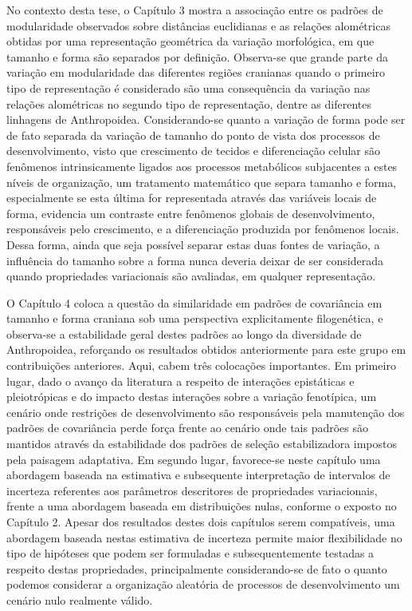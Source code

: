 \documentclass[12pt,twoside]{report}
\begin{document}
No contexto desta tese, o Capítulo 3 mostra a associação entre os
padrões de modularidade observados sobre distâncias euclidianas e as
relações alométricas obtidas por uma representação geométrica da
variação morfológica, em que tamanho e forma são separados por
definição. Observa-se que grande parte da variação em modularidade das
diferentes regiões cranianas quando o primeiro tipo de representação é
considerado são uma consequência da variação nas relações alométricas no
segundo tipo de representação, dentre as diferentes linhagens de
Anthropoidea. Considerando-se quanto a variação de forma pode ser de
fato separada da variação de tamanho do ponto de vista dos processos de
desenvolvimento, visto que crescimento de tecidos e diferenciação
celular são fenômenos intrinsicamente ligados aos processos metabólicos
subjacentes a estes níveis de organização, um tratamento matemático que
separa tamanho e forma, especialmente se esta última for representada
através das variáveis locais de forma, evidencia um contraste entre
fenômenos globais de desenvolvimento, responsáveis pelo crescimento, e a
diferenciação produzida por fenômenos locais. Dessa forma, ainda que
seja possível separar estas duas fontes de variação, a influência do
tamanho sobre a forma nunca deveria deixar de ser considerada quando
propriedades variacionais são avaliadas, em qualquer representação.

O Capítulo 4 coloca a questão da similaridade em padrões de covariância
em tamanho e forma craniana sob uma perspectiva explicitamente
filogenética, e observa-se a estabilidade geral destes padrões ao longo
da diversidade de Anthropoidea, reforçando os resultados obtidos
anteriormente para este grupo em contribuições anteriores. Aqui, cabem
três colocações importantes. Em primeiro lugar, dado o avanço da
literatura a respeito de interações epistáticas e pleiotrópicas e do
impacto destas interações sobre a variação fenotípica, um cenário onde
restrições de desenvolvimento são responsáveis pela manutenção dos
padrões de covariância perde força frente ao cenário onde tais padrões
são mantidos através da estabilidade dos padrões de seleção
estabilizadora impostos pela paisagem adaptativa. Em segundo lugar,
favorece-se neste capítulo uma abordagem baseada na estimativa e
subsequente interpretação de intervalos de incerteza referentes aos
parâmetros descritores de propriedades variacionais, frente a uma
abordagem baseada em distribuições nulas, conforme o exposto no Capítulo
2. Apesar dos resultados destes dois capítulos serem compatíveis, uma
abordagem baseada nestas estimativa de incerteza permite maior
flexibilidade no tipo de hipóteses que podem ser formuladas e
subsequentemente testadas a respeito destas propriedades, principalmente
considerando-se de fato o quanto podemos considerar a organização
aleatória de processos de desenvolvimento um cenário nulo realmente
válido.
\end{document}
